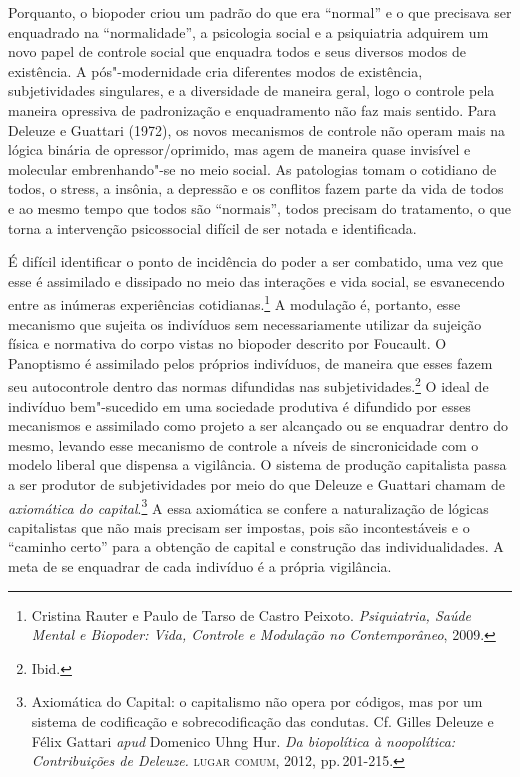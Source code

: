 Porquanto, o biopoder criou um padrão do que era ``normal'' e o que
precisava ser enquadrado na ``normalidade'', a psicologia social e a
psiquiatria adquirem um novo papel de controle social que enquadra todos
e seus diversos modos de existência. A pós"-modernidade cria diferentes
modos de existência, subjetividades singulares, e a diversidade de
maneira geral, logo o controle pela maneira opressiva de padronização e
enquadramento não faz mais sentido. Para Deleuze e Guattari (1972), os
novos mecanismos de controle não operam mais na lógica binária de
opressor/oprimido, mas agem de maneira quase invisível e molecular
embrenhando"-se no meio social. As patologias tomam o cotidiano de todos,
o stress, a insônia, a depressão e os conflitos fazem parte da vida de
todos e ao mesmo tempo que todos são ``normais'', todos precisam do
tratamento, o que torna a intervenção psicossocial difícil de ser notada
e identificada.

É difícil identificar o ponto de incidência do poder a ser combatido,
uma vez que esse é assimilado e dissipado no meio das interações e vida
social, se esvanecendo entre as inúmeras experiências cotidianas.\footnote{Cristina Rauter e Paulo de Tarso de Castro Peixoto. \emph{Psiquiatria, Saúde Mental e Biopoder: Vida, Controle e Modulação no Contemporâneo}, 2009.} A modulação é, portanto, esse mecanismo que
sujeita os indivíduos sem necessariamente utilizar da sujeição física e
normativa do corpo vistas no biopoder descrito por Foucault. O
Panoptismo é assimilado pelos próprios indivíduos, de maneira que esses
fazem seu autocontrole dentro das normas difundidas nas subjetividades.\footnote{Ibid.}
O ideal de indivíduo bem"-sucedido em
uma sociedade produtiva é difundido por esses mecanismos e assimilado
como projeto a ser alcançado ou se enquadrar dentro do mesmo, levando
esse mecanismo de controle a níveis de sincronicidade com o modelo
liberal que dispensa a vigilância. O sistema de produção capitalista
passa a ser produtor de subjetividades por meio do que Deleuze e
Guattari chamam de \emph{axiomática do capital}.\footnote{Axiomática do
  Capital: o capitalismo não opera por códigos, mas por um sistema de
  codificação e sobrecodificação das condutas. Cf. Gilles Deleuze e Félix Gattari
\emph{apud} Domenico Uhng Hur. \emph{Da biopolítica à noopolítica: Contribuições de Deleuze.} \textsc{lugar comum}, 2012, pp.\,201-215.} A essa axiomática se confere a
naturalização de lógicas capitalistas que não mais precisam ser
impostas, pois são incontestáveis e o ``caminho certo'' para a obtenção
de capital e construção das individualidades. A meta de se enquadrar de
cada indivíduo é a própria vigilância.

